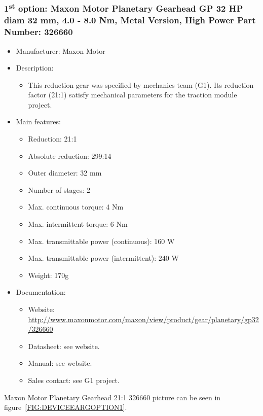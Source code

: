 \subsubsection{1\textsuperscript{st} option: Maxon Motor Planetary Gearhead GP 32 HP diam 32 mm, 4.0 - 8.0 Nm, Metal Version, High Power Part Number: 326660} \label{DEVICE:GEAR1}
\begin{itemize}
  \item Manufacturer: Maxon Motor
  \item Description:
  \begin{itemize}
    \item This reduction gear was specified by mechanics team (G1). Its reduction factor (21:1) satisfy mechanical parameters for the traction module project.
  \end{itemize}
  \item Main features:
  \begin{itemize}
    \item Reduction: 21:1
    \item Absolute reduction: 299:14
    \item Outer diameter: 32 mm
    \item Number of stages: 2
    \item Max. continuous torque: 4 Nm
    \item Max. intermittent torque: 6 Nm
    \item Max. transmittable power (continuous): 160 W
    \item Max. transmittable power (intermittent): 240 W
    \item Weight: 170g
  \end{itemize}
  \item Documentation:
  \begin{itemize}
    \item Website: \href{http://www.maxonmotor.com/maxon/view/product/gear/planetary/gp32/326660}{http://www.maxonmotor.com/maxon/view/product/gear/planetary/gp32/326660}
    \item Datasheet: see website.
    \item Manual: see website.
    \item Sales contact: see G1 project.
  \end{itemize}
\end{itemize}
Maxon Motor Planetary Gearhead 21:1 326660 picture can be seen in figure~\ref{FIG:DEVICEEARGOPTION1}.
